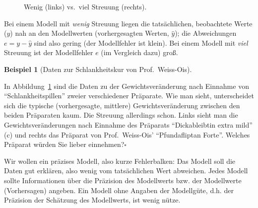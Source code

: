 \documentclass[
  letterpaper,
  twoside,
  open=any]{scrbook}
\theoremstyle{definition}
\theoremstyle{definition}
\theoremstyle{definition}
\newtheorem{example}{Beispiel}[chapter]
\theoremstyle{remark}
\begin{document}
\begin{figure}


\caption{\label{fig-streuung}Wenig (links) vs.~viel Streuung (rechts).}

\end{figure}%

Bei einem Modell mit \emph{wenig} Streuung liegen die tatsächlichen,
beobachtete Werte (\(y\)) nah an den Modellwerten (vorhergesagten
Werten, \(\hat{y}\)); die Abweichungen \(e = y - \hat{y}\) sind also
gering (der Modellfehler ist klein). Bei einem Modell mit \emph{viel}
Streuung ist der Modellfehler \(e\) (im Vergleich dazu) groß.

\begin{example}[Daten zur Schlankheitskur von
Prof.~Weiss-Ois]\protect\hypertarget{exm-weiss-ois}{}\label{exm-weiss-ois}

In Abbildung~\ref{fig-streuung} sind die Daten zu der
Gewichtsveränderung nach Einnahme von \enquote{Schlankheitspillen}
zweier verschiedener Präparate. Wie man sieht, unterscheidet sich die
typische (vorhergesagte, mittlere) Gewichtsveränderung zwischen den
beiden Präparaten kaum. Die Streuung allerdings schon. Links sieht man
die Gewichtsveränderungen nach Einnahme des Präparats
\enquote{Dickableibtin extra mild} (c) und rechts das Präparat von
Prof.~Weiss-Ois' \enquote{Pfundafliptan Forte}. Welches Präparat würden
Sie lieber einnehmen?\(\square\)

\end{example}

Wir wollen ein präzises Modell, also kurze Fehlerbalken: Das Modell soll
die Daten gut erklären, also wenig vom tatsächlichen Wert abweichen.
Jedes Modell sollte Informationen über die Präzision des Modellwerts
bzw. der Modellwerte (Vorhersagen) angeben. Ein Modell ohne Angaben der
Modellgüte, d.h. der Präzision der Schätzung des Modellwerts, ist wenig
nütze.
\end{document}
